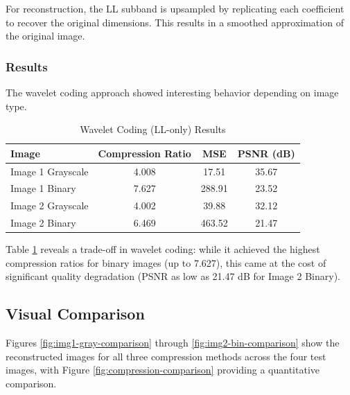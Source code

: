 \documentclass[12pt, a4paper]{AnantDocumentation}
\begin{document}
For reconstruction, the LL subband is upsampled by replicating each coefficient to recover the original dimensions. This results in a smoothed approximation of the original image.

\subsubsection{Results}
The wavelet coding approach showed interesting behavior depending on image type.

\begin{table}[h!]
	\centering
	\begin{tabular}{lccc}
		\toprule
		Image & Compression Ratio & MSE & PSNR (dB) \\
		\midrule
		Image 1 Grayscale & 4.008 & 17.51 & 35.67 \\
		Image 1 Binary & 7.627 & 288.91 & 23.52 \\
		Image 2 Grayscale & 4.002 & 39.88 & 32.12 \\
		Image 2 Binary & 6.469 & 463.52 & 21.47 \\
		\bottomrule
	\end{tabular}
	\caption{Wavelet Coding (LL-only) Results}
	\label{tab:dwt-results}
\end{table}

Table \ref{tab:dwt-results} reveals a trade-off in wavelet coding: while it achieved the highest compression ratios for binary images (up to 7.627), this came at the cost of significant quality degradation (PSNR as low as 21.47 dB for Image 2 Binary).

\subsection{Visual Comparison}
\label{subsec:visual-comparison}
Figures \ref{fig:img1-gray-comparison} through \ref{fig:img2-bin-comparison} show the reconstructed images for all three compression methods across the four test images, with Figure \ref{fig:compression-comparison} providing a quantitative comparison.
\end{document}
